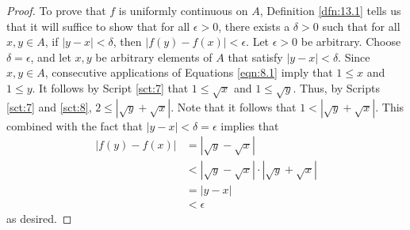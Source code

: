 \documentclass[../main.tex]{subfiles}
\begin{document}
\begin{exercise}
\begin{enumerate}[label={(\alph*)}]
\begin{proof}
            To prove that $f$ is uniformly continuous on $A$, Definition \ref{dfn:13.1} tells us that it will suffice to show that for all $\epsilon>0$, there exists a $\delta>0$ such that for all $x,y\in A$, if $|y-x|<\delta$, then $|f(y)-f(x)|<\epsilon$. Let $\epsilon>0$ be arbitrary. Choose $\delta=\epsilon$, and let $x,y$ be arbitrary elements of $A$ that satisfy $|y-x|<\delta$. Since $x,y\in A$, consecutive applications of Equations \ref{eqn:8.1} imply that $1\leq x$ and $1\leq y$. It follows by Script \ref{sct:7} that $1\leq\sqrt{x}$ and $1\leq\sqrt{y}$. Thus, by Scripts \ref{sct:7} and \ref{sct:8}, $2\leq|\sqrt{y}+\sqrt{x}|$. Note that it follows that $1<|\sqrt{y}+\sqrt{x}|$. This combined with the fact that $|y-x|<\delta=\epsilon$ implies that
            \begin{align*}
                |f(y)-f(x)| &= |\sqrt{y}-\sqrt{x}|\\
                &< |\sqrt{y}-\sqrt{x}|\cdot|\sqrt{y}+\sqrt{x}|\\
                &= |y-x|\\
                &< \epsilon
            \end{align*}
            as desired.
        \end{proof}
    \end{enumerate}
\end{exercise}
\end{document}
